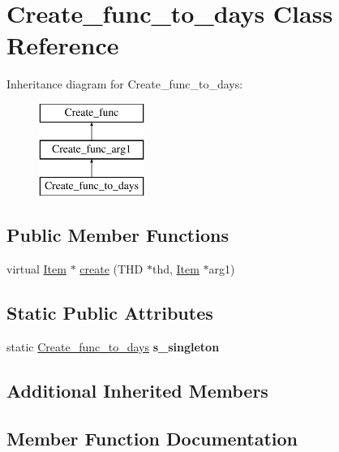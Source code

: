 \hypertarget{classCreate__func__to__days}{}\section{Create\+\_\+func\+\_\+to\+\_\+days Class Reference}
\label{classCreate__func__to__days}
Inheritance diagram for Create\+\_\+func\+\_\+to\+\_\+days\+:\begin{figure}[H]
\begin{center}
\leavevmode
\includegraphics[height=3.000000cm]{classCreate__func__to__days}
\end{center}
\end{figure}
\subsection*{Public Member Functions}
\begin{DoxyCompactItemize}
\item 
virtual \mbox{\hyperlink{classItem}{Item}} $\ast$ \mbox{\hyperlink{classCreate__func__to__days_a95c9982b8277ceeebd1d6ea579bd450b}{create}} (T\+HD $\ast$thd, \mbox{\hyperlink{classItem}{Item}} $\ast$arg1)
\end{DoxyCompactItemize}
\subsection*{Static Public Attributes}
\begin{DoxyCompactItemize}
\item 
\mbox{\label{classCreate__func__to__days_ab675935d985080c6f32cd891d52f2a55}} 
static \mbox{\hyperlink{classCreate__func__to__days}{Create\+\_\+func\+\_\+to\+\_\+days}} {\bfseries s\+\_\+singleton}
\end{DoxyCompactItemize}
\subsection*{Additional Inherited Members}


\subsection{Member Function Documentation}
\mbox{\label{classCreate__func__to__days_a95c9982b8277ceeebd1d6ea579bd450b}} 
